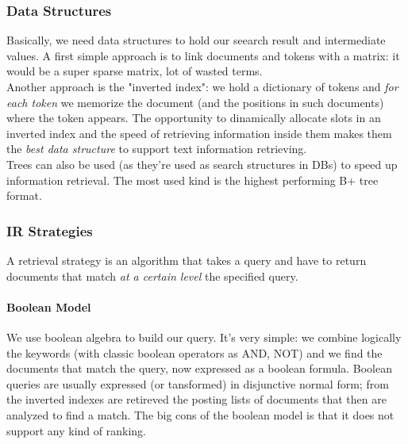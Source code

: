 \documentclass{article}
\begin{document}
			\subsubsection{Data Structures}
				Basically, we need data structures to hold our seearch result and intermediate values. A first simple approach is to link documents and tokens with a matrix: it would be a super sparse matrix, lot of wasted terms.\\
				Another approach is the "inverted index": we hold a dictionary of tokens and \textit{for each token} we memorize the document (and the positions in such documents) where the token appears. The opportunity to dinamically allocate slots in an inverted index and the speed of retrieving information inside them makes them the \textit{best data structure} to support text information retrieving.\\
				Trees can also be used (as they're used as search structures in DBs) to speed up information retrieval. The most used kind is the highest performing B+ tree format.

			\subsubsection{IR Strategies}
				A retrieval strategy is an algorithm that takes a query and have to return documents that match \textit{at a certain level} the specified query.

				\paragraph{Boolean Model}
					We use boolean algebra to build our query. It's very simple: we combine logically the keywords (with classic boolean operators as AND, NOT) and we find the documents that match the query, now expressed as a boolean formula. Boolean queries are usually expressed (or tansformed) in disjunctive normal form; from the inverted indexes are retireved the posting lists of documents that then are analyzed to find a match. The big cons of the boolean model is that it does not support any kind of ranking.
\end{document}
